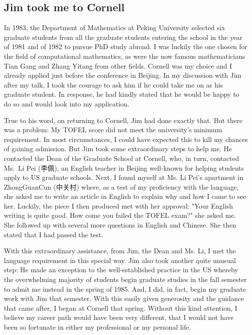 \documentclass[CJK,11pt]{amsart}
\theoremstyle{definition}
\begin{document}
\begin{CJK*}{UTF8}{gbsn}
\section{Jim took me to Cornell}
In 1983, the Department of Mathematics at Peking University selected six graduate students from all the graduate students entering the school in the year of 1981 and of 1982 to pursue PhD study abroad. I was luckily the one chosen for the field of computational mathematics, as were the now famous mathematicians Tian Gang and Zhang Yitang from other fields. Cornell was my choice and I already applied just before the conference in Beijing.  In my discussion with Jim after my talk, I took the courage to ask him if he could take me on as his graduate student. In response, he had kindly stated that he would be happy to do so and would look into my application. 

True to his word, on returning to Cornell, Jim had done exactly that. But there was a problem: My TOFEL score did not meet the university's minimum requirement. In most circumstances, I could have expected this to kill my chances of gaining admission. But Jim took some extraordinary steps to help me. He contacted the Dean of the Graduate School at Cornell, who, in turn, contacted Ms.~Li Pei (李佩), an English teacher in Beijing well-known for helping students apply to US graduate schools. Next, I found myself at Ms. Li Pei's apartment in ZhongGuanCun (中关村) where,  as a test of my proficiency with the language,  she asked me to write an article in English to explain why and how I came to see her. Luckily, the piece I then produced met with her approval: "Your English writing is quite good. How come you failed the TOFEL exam?" she asked me. She followed up with several more questions in English and Chinese. She then stated that I had passed the test.

With this extraordinary assistance, from Jim, the Dean and Ms. Li, I met the language requirement in this special way. Jim also took another quite unusual step: He made an exception to the well-established practice in the US whereby the overwhelming majority of students begin graduate studies in the fall semester to admit me instead in the spring of 1985. And, I did, in fact, begin my graduate work with Jim that semester. With this easily given generosity and the guidance that came after, I began at Cornell that spring. Without this kind attention, I believe my career path would have been very different, that I would not have been so fortunate in either my professional or my personal life.  %



\end{CJK*}
\end{document}

